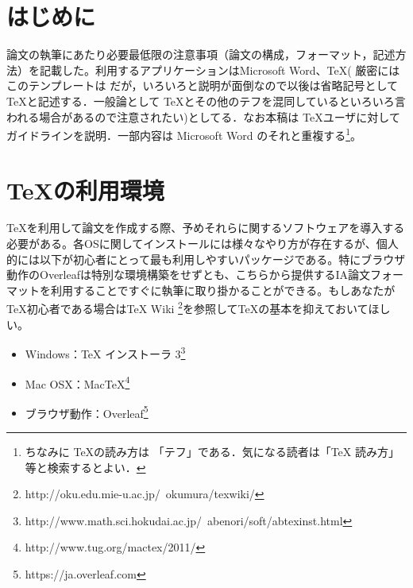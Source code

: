 \documentclass[uplatex,dvipdfmx,a4paper]{jsarticle}
\begin{document}
\makemokuji %

\newpage %

\setcounter{page}{1} %
\pagestyle{plain}

\section{はじめに}

論文の執筆にあたり必要最低限の注意事項（論文の構成，フォーマット，記述方法）を記載した。利用するアプリケーションはMicrosoft Word、\TeX ( 厳密にはこのテンプレートは \pLaTeXe だが，いろいろと説明が面倒なので以後は省略記号として \TeX と記述する．一般論として \TeX とその他のテフを混同しているといろいろ言われる場合があるので注意されたい)としてる．なお本稿は \TeX ユーザに対してガイドラインを説明．一部内容は Microsoft Word のそれと重複する\footnote{ちなみに \TeX の読み方は 「テフ」である．気になる読者は「TeX 読み方」等と検索するとよい．}。

\section{\TeX の利用環境}
\TeX を利用して論文を作成する際、予めそれらに関するソフトウェアを導入する必要がある。各OSに関してインストールには様々なやり方が存在するが、個人的には以下が初心者にとって最も利用しやすいパッケージである。特にブラウザ動作のOverleafは特別な環境構築をせずとも、こちらから提供するIA論文フォーマットを利用することですぐに執筆に取り掛かることができる。もしあなたが\TeX 初心者である場合はTeX Wiki \footnote{http://oku.edu.mie-u.ac.jp/~okumura/texwiki/}を参照してTeXの基本を抑えておいてほしい。
\begin{itemize}
\item Windows：TeX インストーラ 3\footnote{http://www.math.sci.hokudai.ac.jp/~abenori/soft/abtexinst.html}
\item Mac OSX：MacTeX\footnote{http://www.tug.org/mactex/2011/}
\item ブラウザ動作：Overleaf\footnote{https://ja.overleaf.com}
\end{itemize}
\end{document}
